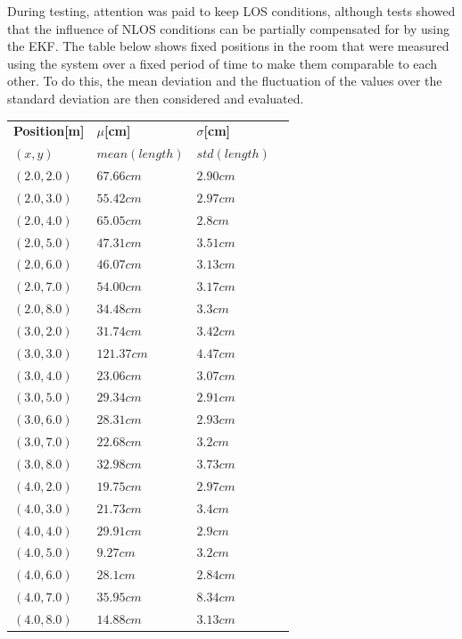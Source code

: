 \documentclass[conference, a4paper]{IEEEtran}
\begin{document}
During testing, attention was paid to keep \ac{LOS} conditions,
although tests showed that the influence of \ac{NLOS} conditions can be partially compensated for by using the \ac{EKF}.
The table below shows fixed positions in the room that were measured using the system
over a fixed period of time to make them comparable to each other.
To do this, the mean deviation and the fluctuation of the values over the standard deviation are then considered and evaluated.

\begin{table}[hbt!]
	\centering
	\begin{tabular}{l l l c}
		\textbf{Position[m]} & \textbf{$\mu$[cm]} & \textbf{$\sigma$[cm]}\\
		$(x,y)$ & $mean(length)$ & $std(length)$\\
		$(2.0,2.0)$ & $67.66cm$ & $2.90cm$\\
		$(2.0,3.0)$ & $55.42cm$ & $2.97cm$\\
		$(2.0,4.0)$ & $65.05cm$ & $2.8cm$\\
		$(2.0,5.0)$ & $47.31cm$ & $3.51cm$\\
		$(2.0,6.0)$ & $46.07cm$ & $3.13cm$\\
		$(2.0,7.0)$ & $54.00cm$ & $3.17cm$\\
		$(2.0,8.0)$ & $34.48cm$ & $3.3cm$\\
		
		$(3.0,2.0)$ & $31.74cm$ & $3.42cm$\\
		$(3.0,3.0)$ & $121.37cm$ & $4.47cm$\\
		$(3.0,4.0)$ & $23.06cm$ & $3.07cm$\\
		$(3.0,5.0)$ & $29.34cm$ & $2.91cm$\\
		$(3.0,6.0)$ & $28.31cm$ & $2.93cm$\\
		$(3.0,7.0)$ & $22.68cm$ & $3.2cm$\\
		$(3.0,8.0)$ & $32.98cm$ & $3.73cm$\\
		
		$(4.0,2.0)$ & $19.75cm$ & $2.97cm$\\
		$(4.0,3.0)$ & $21.73cm$ & $3.4cm$\\
		$(4.0,4.0)$ & $29.91cm$ & $2.9cm$\\
		$(4.0,5.0)$ & $9.27cm$ & $3.2cm$\\
		$(4.0,6.0)$ & $28.1cm$ & $2.84cm$\\
		$(4.0,7.0)$ & $35.95cm$ & $8.34cm$\\
		$(4.0,8.0)$ & $14.88cm$ & $3.13cm$\\
		

\end{tabular}
\end{table}
\end{document}
